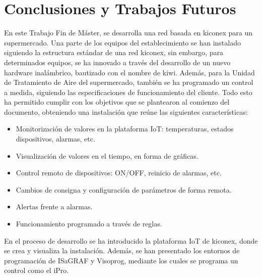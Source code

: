
\cleardoublepage
\chapter{Conclusiones y Trabajos Futuros}

\label{chap:conclusiones} %

En este Trabajo Fin de Máster, se desarrolla una red basada en kiconex para un supermercado. Una parte de los equipos del establecimiento se han instalado siguiendo la estructura estándar de una red kiconex, sin embargo, para determinados equipos, se ha innovado a través del desarrollo de un nuevo hardware inalámbrico, bautizado con el nombre de kiwi. Además, para la Unidad de Tratamiento de Aire del supermercado, también se ha programado un control a medida, siguiendo las especificaciones de funcionamiento del cliente. Todo esto ha permitido cumplir con los objetivos que se plantearon al comienzo del documento, obteniendo una instalación que reúne las siguientes características:

\begin{itemize}
    \item Monitorización de valores en la plataforma IoT: temperaturas, estados dispositivos, alarmas, etc.
    \item Visualización de valores en el tiempo, en forma de gráficas.
    \item Control remoto de dispositivos: ON/OFF, reinicio de alarmas, etc.
    \item Cambios de consigna y configuración de parámetros de forma remota.
    \item Alertas frente a alarmas.
    \item Funcionamiento programado a través de reglas.
\end{itemize}

En el proceso de desarrollo se ha introducido la plataforma IoT de kiconex, donde se crea y visualiza la instalación. Además, se han presentado los entornos de programación de ISaGRAF y Visoprog, mediante los cuales se programa un control como el iPro.

